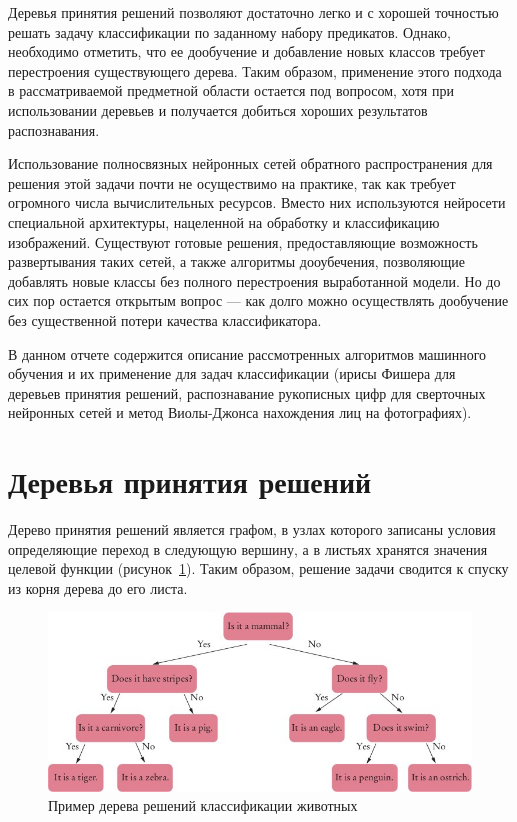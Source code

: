 \documentclass[a4paper,14pt]{extarticle} %
\begin{document}
Деревья принятия решений позволяют достаточно легко и с хорошей точностью решать задачу классификации по заданному набору предикатов. Однако, необходимо отметить, что ее дообучение и добавление новых классов требует перестроения существующего дерева. Таким образом, применение этого подхода в рассматриваемой предметной области остается под вопросом, хотя при использовании деревьев и получается добиться хороших результатов распознавания.

Использование полносвязных нейронных сетей обратного распространения для решения этой задачи почти не осуществимо на практике, так как требует огромного числа вычислительных ресурсов. Вместо них используются нейросети специальной архитектуры, нацеленной на обработку и классификацию изображений. Существуют готовые решения, предоставляющие возможность развертывания таких сетей, а также алгоритмы дооубечения, позволяющие добавлять новые классы без полного перестроения выработанной модели. Но до сих пор остается открытым вопрос --- как долго можно осуществлять дообучение без существенной потери качества классификатора.

В данном отчете содержится описание рассмотренных алгоритмов машинного обучения и их применение для задач классификации (ирисы Фишера для деревьев принятия решений, распознавание рукописных цифр для сверточных нейронных сетей и метод Виолы-Джонса нахождения лиц на фотографиях).

\newpage
\renewcommand{\contentsname}{\centering Разделы}
\tableofcontents
\newpage

\section{Деревья принятия решений} 
\hspace{\parindent} Дерево принятия решений является графом, в узлах которого записаны условия определяющие переход в следующую вершину, а в листьях хранятся значения целевой функции (рисунок~\ref{fig:decision-tree}). Таким образом, решение задачи сводится к спуску из корня дерева до его листа.

\begin{figure}[H]
\centering
\includegraphics[width=0.8\linewidth]{decision-tree.jpg}
\caption{Пример дерева решений классификации животных}
\label{fig:decision-tree}
\end{figure}
\end{document}
